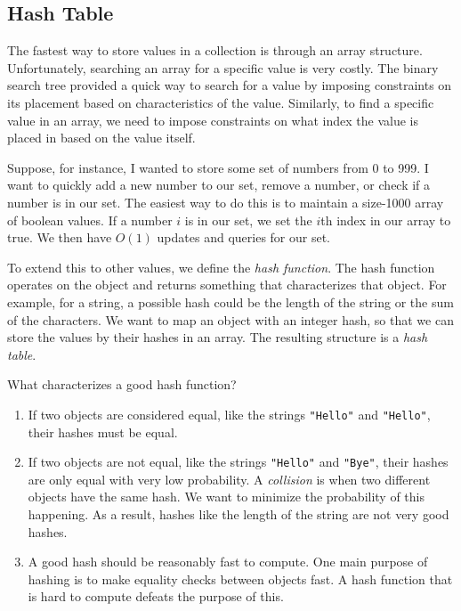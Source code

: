 \subsection{Hash Table}

The fastest way to store values in a collection is through an array structure. Unfortunately, searching an array for a specific value is very costly. The binary search tree provided a quick way to search for a value by imposing constraints on its placement based on characteristics of the value. Similarly, to find a specific value in an array, we need to impose constraints on what index the value is placed in based on the value itself.

Suppose, for instance, I wanted to store some set of numbers from 0 to 999. I want to quickly add a new number to our set, remove a number, or check if a number is in our set. The easiest way to do this is to maintain a size-1000 array of boolean values. If a number $i$ is in our set, we set the $i$th index in our array to true. We then have $O(1)$ updates and queries for our set.

To extend this to other values, we define the \textit{hash function}. The hash function operates on the object and returns something that characterizes that object. For example, for a string, a possible hash could be the length of the string or the sum of the characters. We want to map an object with an integer hash, so that we can store the values by their hashes in an array. The resulting structure is a \textit{hash table}.

What characterizes a good hash function?

\begin{enumerate}
\item
If two objects are considered equal, like the strings \texttt{"Hello"} and \texttt{"Hello"}, their hashes must be equal.
\item
If two objects are not equal, like the strings \texttt{"Hello"} and \texttt{"Bye"}, their hashes are only equal with very low probability. A \textit{collision} is when two different objects have the same hash. We want to minimize the probability of this happening. As a result, hashes like the length of the string are not very good hashes.
\item
A good hash should be reasonably fast to compute. One main purpose of hashing is to make equality checks between objects fast. A hash function that is hard to compute defeats the purpose of this.
\end{enumerate}

